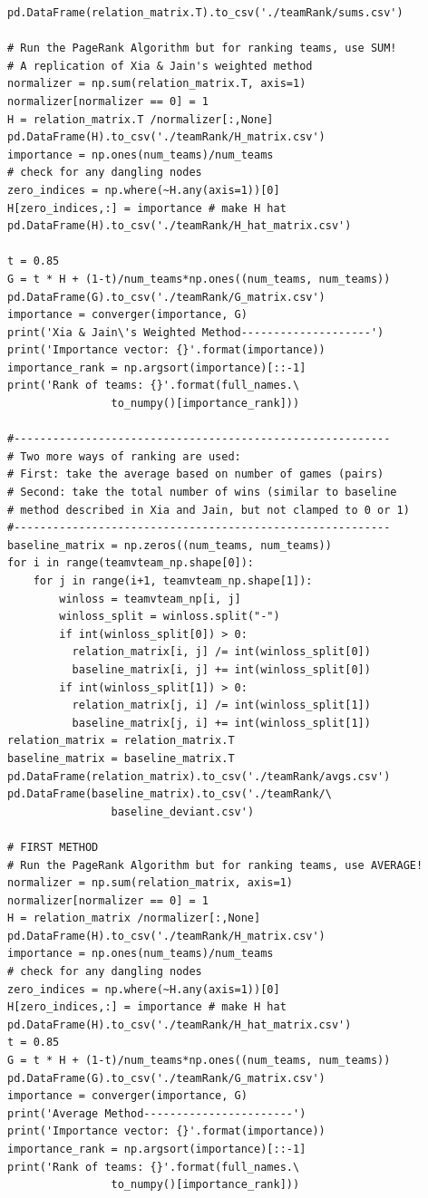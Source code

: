 \documentclass[12pt]{article}%
\begin{document}
\begin{lstlisting}
pd.DataFrame(relation_matrix.T).to_csv('./teamRank/sums.csv')

# Run the PageRank Algorithm but for ranking teams, use SUM!
# A replication of Xia & Jain's weighted method
normalizer = np.sum(relation_matrix.T, axis=1)
normalizer[normalizer == 0] = 1
H = relation_matrix.T /normalizer[:,None]
pd.DataFrame(H).to_csv('./teamRank/H_matrix.csv')
importance = np.ones(num_teams)/num_teams
# check for any dangling nodes
zero_indices = np.where(~H.any(axis=1))[0]
H[zero_indices,:] = importance # make H hat
pd.DataFrame(H).to_csv('./teamRank/H_hat_matrix.csv')

t = 0.85
G = t * H + (1-t)/num_teams*np.ones((num_teams, num_teams))
pd.DataFrame(G).to_csv('./teamRank/G_matrix.csv')
importance = converger(importance, G)
print('Xia & Jain\'s Weighted Method--------------------')
print('Importance vector: {}'.format(importance))
importance_rank = np.argsort(importance)[::-1]
print('Rank of teams: {}'.format(full_names.\
				to_numpy()[importance_rank]))

#----------------------------------------------------------
# Two more ways of ranking are used:
# First: take the average based on number of games (pairs)
# Second: take the total number of wins (similar to baseline
# method described in Xia and Jain, but not clamped to 0 or 1)
#----------------------------------------------------------
baseline_matrix = np.zeros((num_teams, num_teams))
for i in range(teamvteam_np.shape[0]):
	for j in range(i+1, teamvteam_np.shape[1]):
		winloss = teamvteam_np[i, j]
		winloss_split = winloss.split("-")
		if int(winloss_split[0]) > 0:
		  relation_matrix[i, j] /= int(winloss_split[0])
		  baseline_matrix[i, j] += int(winloss_split[0])
		if int(winloss_split[1]) > 0:
		  relation_matrix[j, i] /= int(winloss_split[1])
		  baseline_matrix[j, i] += int(winloss_split[1])
relation_matrix = relation_matrix.T 
baseline_matrix = baseline_matrix.T 
pd.DataFrame(relation_matrix).to_csv('./teamRank/avgs.csv')
pd.DataFrame(baseline_matrix).to_csv('./teamRank/\
				baseline_deviant.csv')

# FIRST METHOD
# Run the PageRank Algorithm but for ranking teams, use AVERAGE!
normalizer = np.sum(relation_matrix, axis=1)
normalizer[normalizer == 0] = 1
H = relation_matrix /normalizer[:,None]
pd.DataFrame(H).to_csv('./teamRank/H_matrix.csv')
importance = np.ones(num_teams)/num_teams
# check for any dangling nodes
zero_indices = np.where(~H.any(axis=1))[0] 
H[zero_indices,:] = importance # make H hat
pd.DataFrame(H).to_csv('./teamRank/H_hat_matrix.csv')
t = 0.85
G = t * H + (1-t)/num_teams*np.ones((num_teams, num_teams))
pd.DataFrame(G).to_csv('./teamRank/G_matrix.csv')
importance = converger(importance, G)
print('Average Method-----------------------')
print('Importance vector: {}'.format(importance))
importance_rank = np.argsort(importance)[::-1]
print('Rank of teams: {}'.format(full_names.\
				to_numpy()[importance_rank]))


\end{lstlisting}
\end{document}
